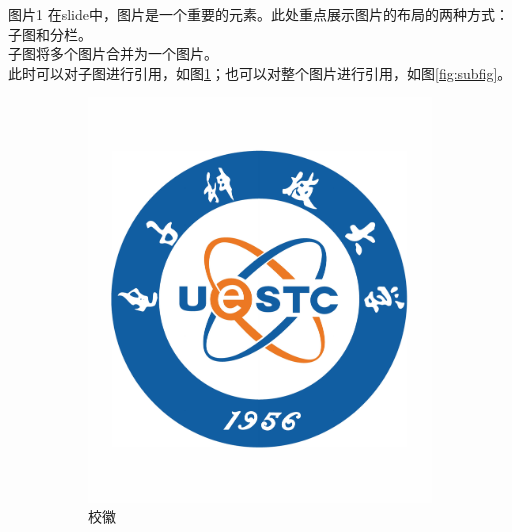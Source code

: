 \documentclass[aspectratio=169]{beamer}
\begin{document}
\begin{frame}{图片1}
    \footnotesize
    在slide中，图片是一个重要的元素。此处重点展示图片的布局的两种方式：子图和分栏。\\
    子图将多个图片合并为一个图片。\\
    此时可以对子图进行引用，如图\ref{fig:subfig1}；也可以对整个图片进行引用，如图\ref{fig:subfig}。
    \begin{figure}
        \centering
        \begin{subfigure}{0.3\textwidth}
            \centering
            \includegraphics[width=\textwidth]{logo.pdf}
            \caption{校徽}
            \label{fig:subfig1}
        \end{subfigure}
        \begin{subfigure}{0.3\textwidth}
            \centering

\end{subfigure}
\end{figure}
\end{frame}
\end{document}
